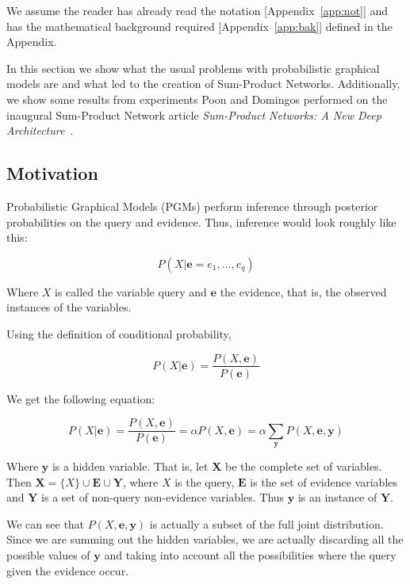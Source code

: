 \documentclass[a4paper,10pt]{article}
\theoremstyle{plain}
\begin{document}
We assume the reader has already read the notation [Appendix~\ref{app:not}] and has the
mathematical background required [Appendix~\ref{app:bak}] defined in the Appendix.

In this section we show what the usual problems with probabilistic graphical models are and what
led to the creation of Sum-Product Networks. Additionally, we show some results from experiments
Poon and Domingos performed on the inaugural Sum-Product Network article \textit{Sum-Product
Networks: A New Deep Architecture}~\cite{poon-domingos}.

\subsection{Motivation}

Probabilistic Graphical Models (PGMs) perform inference through posterior probabilities on the
query and evidence. Thus, inference would look roughly like this:

\begin{equation*}
  P(X | \mathbf{e}=e_1,\ldots,e_q)
\end{equation*}

Where $X$ is called the variable query and $\mathbf{e}$ the evidence, that is, the observed
instances of the variables.

Using the definition of conditional probability,

\begin{equation*}
  P(X|\mathbf{e})=\frac{P(X,\mathbf{e})}{P(\mathbf{e})}
\end{equation*}

We get the following equation:

\begin{equation}
  P(X|\mathbf{e})=\frac{P(X,\mathbf{e})}{P(\mathbf{e})}=\alpha P(X,\mathbf{e})=\alpha
  \sum_{\mathbf{y}} P(X,\mathbf{e},\mathbf{y})
\end{equation}

Where $\mathbf{y}$ is a hidden variable. That is, let $\mathbf{X}$ be the complete set of
variables. Then $\mathbf{X}=\{X\} \cup \mathbf{E} \cup \mathbf{Y}$, where $X$ is the query,
$\mathbf{E}$ is the set of evidence variables and $\mathbf{Y}$ is a set of non-query non-evidence
variables. Thus $\mathbf{y}$ is an instance of $\mathbf{Y}$.

We can see that $P(X,\mathbf{e},\mathbf{y})$ is actually a subset of the full joint distribution.
Since we are summing out the hidden variables, we are actually discarding all the possible values
of $\mathbf{y}$ and taking into account all the possibilities where the query given the evidence
occur.
\end{document}
